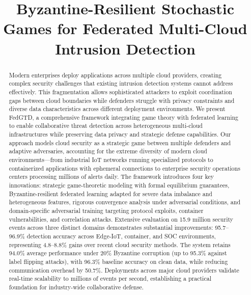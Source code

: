 \documentclass[12pt,a4paper]{article}
\theoremstyle{definition}
\begin{document}
\title{\textbf{Byzantine-Resilient Stochastic Games for Federated Multi-Cloud Intrusion Detection}}
\vspace{-2.5cm}
\date{}
\maketitle

\begin{abstract}
\noindent Modern enterprises deploy applications across multiple cloud providers, creating complex security challenges that existing intrusion detection systems cannot address effectively. This fragmentation allows sophisticated attackers to exploit coordination gaps between cloud boundaries while defenders struggle with privacy constraints and diverse data characteristics across different deployment environments. We present FedGTD, a comprehensive framework integrating game theory with federated learning to enable collaborative threat detection across heterogeneous multi-cloud infrastructures while preserving data privacy and strategic defense capabilities. Our approach models cloud security as a strategic game between multiple defenders and adaptive adversaries, accounting for the extreme diversity of modern cloud environments—from industrial IoT networks running specialized protocols to containerized applications with ephemeral connections to enterprise security operations centers processing millions of alerts daily. The framework introduces four key innovations: strategic game-theoretic modeling with formal equilibrium guarantees, Byzantine-resilient federated learning adapted for severe data imbalance and heterogeneous features, rigorous convergence analysis under adversarial conditions, and domain-specific adversarial training targeting protocol exploits, container vulnerabilities, and correlation attacks. Extensive evaluation on 15.9 million security events across three distinct domains demonstrates substantial improvements: 95.7--96.9\% detection accuracy across Edge-IoT, container, and SOC environments, representing 4.8--8.8\% gains over recent cloud security methods. The system retains 94.0\% average performance under 20\% Byzantine corruption (up to 95.3\% against label flipping attacks), with 96.3\% baseline accuracy on clean data, while reducing communication overhead by 50.7\%. Deployments across major cloud providers validate real-time scalability to millions of events per second, establishing a practical foundation for industry-wide collaborative defense.
\end{abstract}
\end{document}
